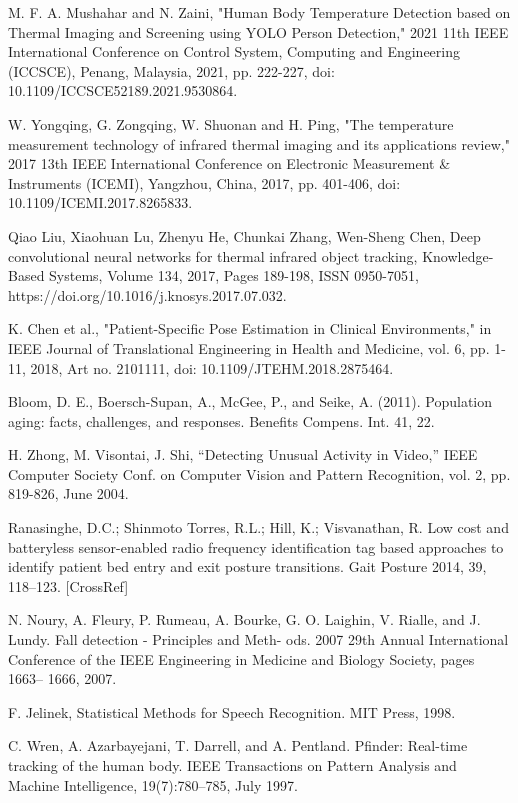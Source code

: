 \documentclass[12pt]{article}
\begin{document}
\noindent M. F. A. Mushahar and N. Zaini, "Human Body Temperature Detection based on Thermal Imaging and Screening using YOLO Person Detection," 2021 11th IEEE International Conference on Control System, Computing and Engineering (ICCSCE), Penang, Malaysia, 2021, pp. 222-227, doi: 10.1109/ICCSCE52189.2021.9530864.

\noindent W. Yongqing, G. Zongqing, W. Shuonan and H. Ping, "The temperature measurement technology of infrared thermal imaging and its applications review," 2017 13th IEEE International Conference on Electronic Measurement \& Instruments (ICEMI), Yangzhou, China, 2017, pp. 401-406, doi: 10.1109/ICEMI.2017.8265833.

\noindent Qiao Liu, Xiaohuan Lu, Zhenyu He, Chunkai Zhang, Wen-Sheng Chen, Deep convolutional neural networks for thermal infrared object tracking, Knowledge-Based Systems, Volume 134, 2017, Pages 189-198, ISSN 0950-7051, https://doi.org/10.1016/j.knosys.2017.07.032.

\noindent K. Chen et al., "Patient-Specific Pose Estimation in Clinical Environments," in IEEE Journal of Translational Engineering in Health and Medicine, vol. 6, pp. 1-11, 2018, Art no. 2101111, doi: 10.1109/JTEHM.2018.2875464.

\noindent Bloom, D. E., Boersch-Supan, A., McGee, P., and Seike, A. (2011). Population aging: facts, challenges, and responses. Benefits Compens. Int. 41, 22.

\noindent H. Zhong, M. Visontai, J. Shi, “Detecting Unusual Activity in Video,”
IEEE Computer Society Conf. on Computer Vision and Pattern
Recognition, vol. 2, pp. 819-826, June 2004.

\noindent Ranasinghe, D.C.; Shinmoto Torres, R.L.; Hill, K.; Visvanathan, R. Low cost and batteryless sensor-enabled radio frequency identification tag based approaches to identify patient bed entry and exit posture transitions. Gait Posture 2014, 39, 118–123. [CrossRef]

\noindent N. Noury, A. Fleury, P. Rumeau, A. Bourke, G. O. Laighin, V. Rialle, and J. Lundy. Fall detection - Principles and Meth- ods. 2007 29th Annual International Conference of the IEEE Engineering in Medicine and Biology Society, pages 1663– 1666, 2007.

\noindent F. Jelinek, Statistical Methods for Speech Recognition. MIT Press, 1998.

\noindent C. Wren, A. Azarbayejani, T. Darrell, and A. Pentland. Pfinder: Real-time tracking of the human body. IEEE Transactions on Pattern Analysis and Machine Intelligence, 19(7):780–785, July 1997.
\end{document}
